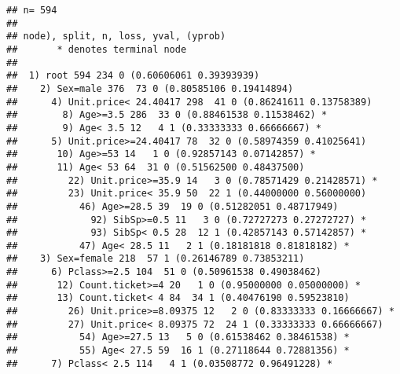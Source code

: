 \documentclass[
]{article}
\newenvironment{Shaded}{\begin{snugshade}}{\end{snugshade}}
\newcommand{\DataTypeTok}[1]{\textcolor[rgb]{0.87,0.87,0.75}{#1}}
\newcommand{\DecValTok}[1]{\textcolor[rgb]{0.86,0.86,0.80}{#1}}
\newcommand{\FloatTok}[1]{\textcolor[rgb]{0.75,0.75,0.82}{#1}}
\newcommand{\KeywordTok}[1]{\textcolor[rgb]{0.94,0.87,0.69}{#1}}
\newcommand{\NormalTok}[1]{\textcolor[rgb]{0.80,0.80,0.80}{#1}}
\newcommand{\OperatorTok}[1]{\textcolor[rgb]{0.94,0.94,0.82}{#1}}
\newcommand{\StringTok}[1]{\textcolor[rgb]{0.80,0.58,0.58}{#1}}
\begin{document}
\begin{Shaded}
\end{Shaded}

\begin{verbatim}
## n= 594 
## 
## node), split, n, loss, yval, (yprob)
##       * denotes terminal node
## 
##  1) root 594 234 0 (0.60606061 0.39393939)  
##    2) Sex=male 376  73 0 (0.80585106 0.19414894)  
##      4) Unit.price< 24.40417 298  41 0 (0.86241611 0.13758389)  
##        8) Age>=3.5 286  33 0 (0.88461538 0.11538462) *
##        9) Age< 3.5 12   4 1 (0.33333333 0.66666667) *
##      5) Unit.price>=24.40417 78  32 0 (0.58974359 0.41025641)  
##       10) Age>=53 14   1 0 (0.92857143 0.07142857) *
##       11) Age< 53 64  31 0 (0.51562500 0.48437500)  
##         22) Unit.price>=35.9 14   3 0 (0.78571429 0.21428571) *
##         23) Unit.price< 35.9 50  22 1 (0.44000000 0.56000000)  
##           46) Age>=28.5 39  19 0 (0.51282051 0.48717949)  
##             92) SibSp>=0.5 11   3 0 (0.72727273 0.27272727) *
##             93) SibSp< 0.5 28  12 1 (0.42857143 0.57142857) *
##           47) Age< 28.5 11   2 1 (0.18181818 0.81818182) *
##    3) Sex=female 218  57 1 (0.26146789 0.73853211)  
##      6) Pclass>=2.5 104  51 0 (0.50961538 0.49038462)  
##       12) Count.ticket>=4 20   1 0 (0.95000000 0.05000000) *
##       13) Count.ticket< 4 84  34 1 (0.40476190 0.59523810)  
##         26) Unit.price>=8.09375 12   2 0 (0.83333333 0.16666667) *
##         27) Unit.price< 8.09375 72  24 1 (0.33333333 0.66666667)  
##           54) Age>=27.5 13   5 0 (0.61538462 0.38461538) *
##           55) Age< 27.5 59  16 1 (0.27118644 0.72881356) *
##      7) Pclass< 2.5 114   4 1 (0.03508772 0.96491228) *
\end{verbatim}

\begin{Shaded}
\end{Shaded}
\end{document}
